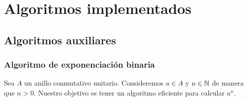 \documentclass[a4paper, 11pt, twoside, notitlepage, openany, onecolumn, final]{report}
\title{\tb{Álgebra Computacional}}
\author{
	Álvaro García Tenorio
	\and
	Miguel Pascual Domínguez
}
\date{\today}
\begin{document}
	\maketitle
	\begin{abstract}
		En este documento se recopilan unas breves explicaciones sobre el funcionamiento de los algoritmos implementados.
	\end{abstract}
	\tableofcontents
	\chapter{Algoritmos implementados}
	\section{Algoritmos auxiliares}
	\subsection{Algoritmo de exponenciación binaria}
	Sea $A$ un anillo conmutativo unitario. Consideremos $a\in A$ y $n\in \mathbb{N}$ de manera que $n>0$. Nuestro objetivo es tener un algoritmo eficiente para calcular $a^n$.
	
\end{document}
